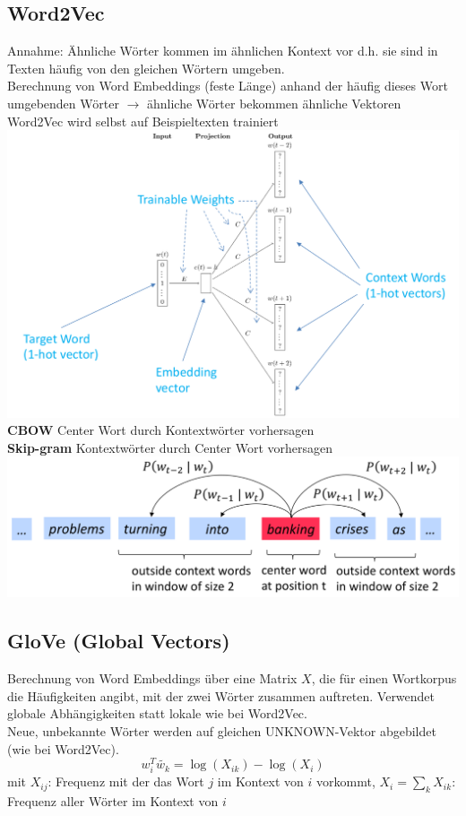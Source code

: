 \documentclass[12pt]{article}
\begin{document}
	\subsection{Word2Vec}
	Annahme: Ähnliche Wörter kommen im ähnlichen Kontext vor d.h. sie sind in Texten häufig von den gleichen Wörtern umgeben.\\
	Berechnung von Word Embeddings (feste Länge) anhand der häufig dieses Wort umgebenden Wörter $\rightarrow$ ähnliche Wörter bekommen ähnliche Vektoren\\
	Word2Vec wird selbst auf Beispieltexten trainiert\\
	\includegraphics[width=\linewidth]{figures/word2vec-nn.png}\\
	\textbf{CBOW} Center Wort durch Kontextwörter vorhersagen\\
	\textbf{Skip-gram} Kontextwörter durch Center Wort vorhersagen\\
	\includegraphics[width=\linewidth]{figures/word2vec.png}

	\subsection{GloVe (Global Vectors)}
	Berechnung von Word Embeddings über eine Matrix $X$, die für einen Wortkorpus die Häufigkeiten angibt, mit der zwei Wörter zusammen auftreten. Verwendet globale Abhängigkeiten statt lokale wie bei Word2Vec.\\
	Neue, unbekannte Wörter werden auf gleichen UNKNOWN-Vektor abgebildet (wie bei Word2Vec).
	$$w_i^T \tilde{w_k} = \log(X_{ik}) - \log(X_i)$$
	mit $X_{ij}$: Frequenz mit der das Wort $j$ im Kontext von $i$ vorkommt, $X_i = \sum_k X_{ik}$: Frequenz aller Wörter im Kontext von $i$
\end{document}
